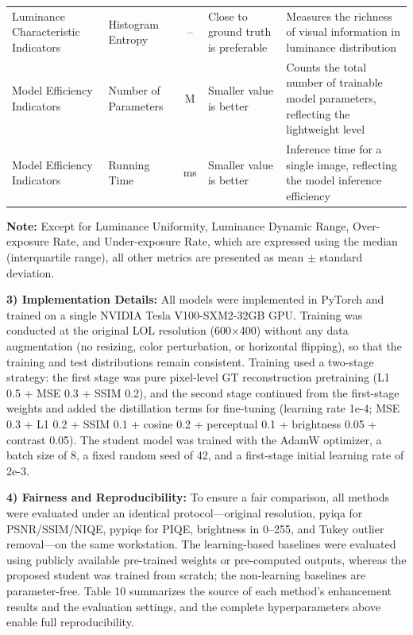 \documentclass[sensors,article,submit,moreauthors]{Definitions/mdpi}
\begin{document}
\begin{table}[H]
\begin{tabularx}{\textwidth}{LLCLL}
Luminance Characteristic Indicators	& Histogram Entropy	& --	& Close to ground truth is preferable	& Measures the richness of visual information in luminance distribution\\
Model Efficiency Indicators	& Number of Parameters	& M	& Smaller value is better	& Counts the total number of trainable model parameters, reflecting the lightweight level\\
Model Efficiency Indicators	& Running Time	& ms	& Smaller value is better	& Inference time for a single image, reflecting the model inference efficiency\\
\bottomrule
\end{tabularx}
\end{table}

\textbf{Note:} Except for Luminance Uniformity, Luminance Dynamic Range, Over-exposure Rate, and Under-exposure Rate, which are expressed using the median (interquartile range), all other metrics are presented as mean $\pm$ standard deviation.

\textbf{3) Implementation Details:} All models were implemented in PyTorch and trained on a single NVIDIA Tesla V100-SXM2-32GB GPU. Training was conducted at the original LOL resolution (600$\times$400) without any data augmentation (no resizing, color perturbation, or horizontal flipping), so that the training and test distributions remain consistent. Training used a two-stage strategy: the first stage was pure pixel-level GT reconstruction pretraining (L1 0.5 + MSE 0.3 + SSIM 0.2), and the second stage continued from the first-stage weights and added the distillation terms for fine-tuning (learning rate 1e-4; MSE 0.3 + L1 0.2 + SSIM 0.1 + cosine 0.2 + perceptual 0.1 + brightness 0.05 + contrast 0.05). The student model was trained with the AdamW optimizer, a batch size of 8, a fixed random seed of 42, and a first-stage initial learning rate of 2e-3.

\textbf{4) Fairness and Reproducibility:} To ensure a fair comparison, all methods were evaluated under an identical protocol---original resolution, pyiqa for PSNR/SSIM/NIQE, pypiqe for PIQE, brightness in 0--255, and Tukey outlier removal---on the same workstation. The learning-based baselines were evaluated using publicly available pre-trained weights or pre-computed outputs, whereas the proposed student was trained from scratch; the non-learning baselines are parameter-free. Table 10 summarizes the source of each method's enhancement results and the evaluation settings, and the complete hyperparameters above enable full reproducibility.
\end{document}
